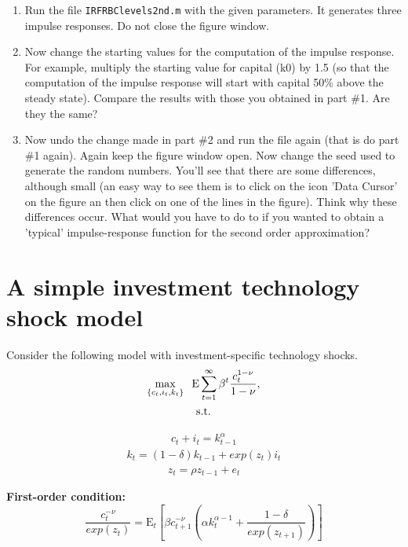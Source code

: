 \documentclass{article}
\begin{document}
\begin{enumerate}
\item Run the file \texttt{IRFRBClevels2nd.m} with the given parameters. It
generates three impulse responses. Do not close the figure window.

\item Now change the starting values for the computation of the impulse
response. For example, multiply the starting value for capital (k0) by 1.5
(so that the computation of the impulse response will start with capital
50\% above the steady state). Compare the results with those you obtained in
part \#1. Are they the same?

\item Now undo the change made in part \#2 and run the file again (that is
do part \#1 again). Again keep the figure window open. Now change the seed
used to generate the random numbers. You'll see that there are some
differences, although small (an easy way to see them is to click on the icon
'Data Cursor' on the figure an then click on one of the lines in the
figure). Think why these differences occur. What would you have to do to if
you wanted to obtain a 'typical' impulse-response function for the second
order approximation?
\end{enumerate}

\section{A simple investment technology shock model}

\noindent Consider the following model with investment-specific technology
shocks. 
\begin{gather*}
\max_{\left\{ c_{t},i_{t},k_{t}\right\} }\hspace{2mm}\displaystyle\text{E}%
\sum_{t=1}^{\infty }\beta ^{t}\frac{c_{t}^{1-\nu }}{1-\nu }, \\
\text{s.t.}
\end{gather*}

\begin{eqnarray*}
c_t + i_t = k_{t-1}^{\alpha}
\end{eqnarray*}
\begin{eqnarray*}
k_t=(1-\delta)k_{t-1} + exp(z_t)i_t
\end{eqnarray*}
\begin{eqnarray*}
z_t=\rho z_{t-1} + e_t
\end{eqnarray*}

\noindent \textbf{First-order condition:} 
\begin{equation*}
\frac{c_{t}^{-\nu }}{exp(z_{t})}=\text{E}_{t}\left[ \beta c_{t+1}^{-\nu
}\left( \alpha k_{t}^{\alpha -1}+\frac{1-\delta }{exp(z_{t+1})}\right) %
\right] 
\end{equation*}
\end{document}

